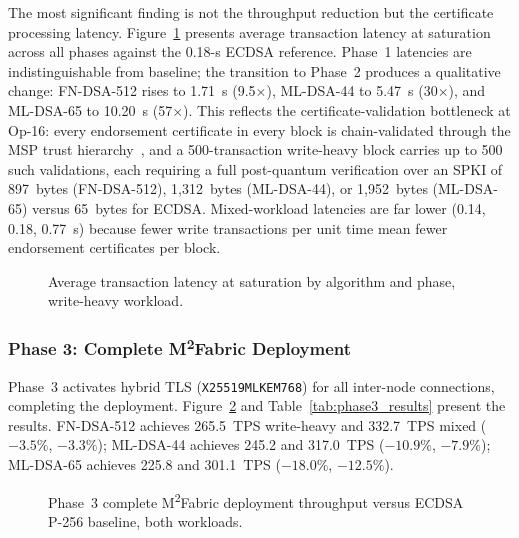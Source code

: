 \documentclass{ieeetj}
\newcommand{\mfabric}{M\textsuperscript{2}Fabric}
\begin{document}
The most significant finding is not the throughput reduction but the certificate
processing latency. Figure~\ref{fig:latency_phase} presents average transaction
latency at saturation across all phases against the 0.18-s ECDSA reference.
Phase~1 latencies are indistinguishable from baseline; the transition to Phase~2
produces a qualitative change: FN-DSA-512 rises to 1.71~s (9.5$\times$),
ML-DSA-44 to 5.47~s (30$\times$), and ML-DSA-65 to 10.20~s (57$\times$). This
reflects the certificate-validation bottleneck at Op-16: every endorsement
certificate in every block is chain-validated through the MSP trust
hierarchy~\cite{thakkar2018}, and a 500-transaction write-heavy block carries up
to 500 such validations, each requiring a full post-quantum verification over an
SPKI of 897~bytes (FN-DSA-512), 1{,}312~bytes (ML-DSA-44), or 1{,}952~bytes
(ML-DSA-65) versus 65~bytes for ECDSA. Mixed-workload latencies are far lower
(0.14, 0.18, 0.77~s) because fewer write transactions per unit time mean fewer
endorsement certificates per block.

\begin{figure}[ht]
\centering

\caption{Average transaction latency at saturation by algorithm and phase, write-heavy workload.}
\label{fig:latency_phase}
\end{figure}

\subsubsection{Phase 3: Complete \texorpdfstring{M\textsuperscript{2}Fabric}{M2Fabric} Deployment}

Phase~3 activates hybrid TLS (\texttt{X25519MLKEM768}) for all inter-node
connections, completing the deployment. Figure~\ref{fig:phase3_throughput} and
Table~\ref{tab:phase3_results} present the results. FN-DSA-512 achieves 265.5~TPS
write-heavy and 332.7~TPS mixed ($-3.5\%$, $-3.3\%$); ML-DSA-44 achieves 245.2
and 317.0~TPS ($-10.9\%$, $-7.9\%$); ML-DSA-65 achieves 225.8 and 301.1~TPS
($-18.0\%$, $-12.5\%$).

\begin{figure}[ht]
\centering

\caption{Phase~3 complete \mfabric{} deployment throughput versus ECDSA P-256 baseline, both workloads.}
\label{fig:phase3_throughput}
\end{figure}
\end{document}
